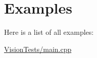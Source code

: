 \section{Examples}
Here is a list of all examples\+:\begin{DoxyCompactItemize}
\item 
\hyperlink{_vision_tests_2main_8cpp-example}{Vision\+Tests/main.\+cpp}
\end{DoxyCompactItemize}
